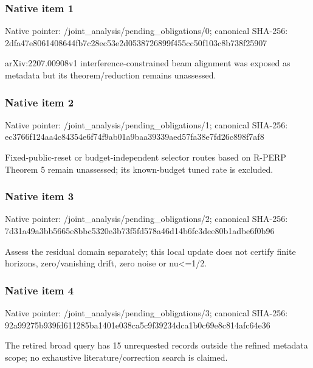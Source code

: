 \documentclass[10pt,a4paper]{article}
\begin{document}
\subsubsection{Native item 1}
Native pointer: /joint\_\allowbreak{}analysis/pending\_\allowbreak{}obligations/0; canonical SHA-256: 2dfa47e8061408644fb7c28ec53e2d0538726899f455cc50f103c8b738f25907

\begingroup\raggedright\sloppy arXiv:\allowbreak{}2207.00908v1 interference-constrained beam alignment was exposed as metadata but its theorem/\allowbreak{}reduction remains unassessed.\par\endgroup

\subsubsection{Native item 2}
Native pointer: /joint\_\allowbreak{}analysis/pending\_\allowbreak{}obligations/1; canonical SHA-256: ec3766f124aa4c84354e6f74f9ab01a9baa39339aed57fa38e7fd26c898f7af8

\begingroup\raggedright\sloppy Fixed-public-reset or budget-independent selector routes based on R-PERP Theorem 5 remain unassessed;\allowbreak{} its known-budget tuned rate is excluded.\par\endgroup

\subsubsection{Native item 3}
Native pointer: /joint\_\allowbreak{}analysis/pending\_\allowbreak{}obligations/2; canonical SHA-256: 7d31a49a3bb5665e8bbc5320e3b73f5fd578a46d14b6fc3dee80b1adbe6f0b96

\begingroup\raggedright\sloppy Assess the residual domain separately;\allowbreak{} this local update does not certify finite horizons,\allowbreak{} zero/\allowbreak{}vanishing drift,\allowbreak{} zero noise or nu<=\allowbreak{}1/\allowbreak{}2.\par\endgroup

\subsubsection{Native item 4}
Native pointer: /joint\_\allowbreak{}analysis/pending\_\allowbreak{}obligations/3; canonical SHA-256: 92a99275b939fd611285ba1401e038ca5c9f39234dca1b0c69e8c814afc64e36

\begingroup\raggedright\sloppy The retired broad query has 15 unrequested records outside the refined metadata scope;\allowbreak{} no exhaustive literature/\allowbreak{}correction search is claimed.\par\endgroup
\end{document}
